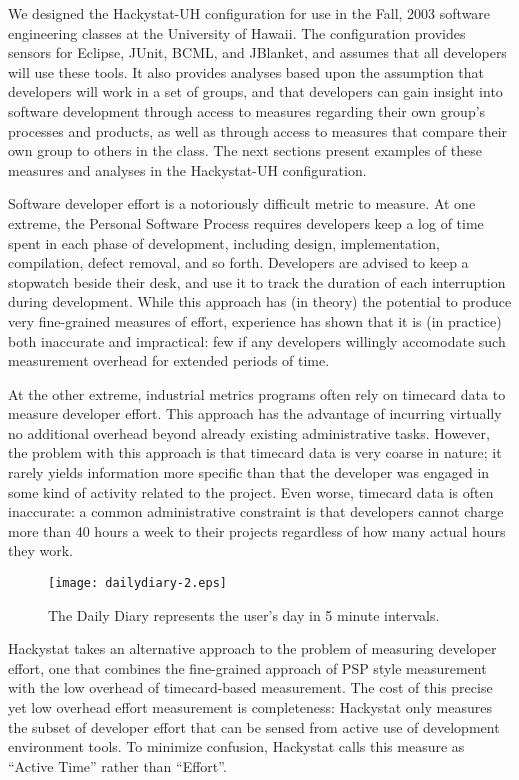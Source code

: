 \documentclass[10pt,twocolumn]{article}
\begin{document}
We designed the Hackystat-UH configuration for use in the Fall, 2003
software engineering classes at the University of Hawaii.  The
configuration provides sensors for Eclipse, JUnit, BCML, and JBlanket, and
assumes that all developers will use these tools.  It also provides
analyses based upon the assumption that developers will work in a set of
groups, and that developers can gain insight into software development
through access to measures regarding their own group's processes and
products, as well as through access to measures that compare their own
group to others in the class.  The next sections present examples of these
measures and analyses in the Hackystat-UH configuration.


Software developer effort is a notoriously difficult metric to measure.  At
one extreme, the Personal Software Process requires developers keep a log
of time spent in each phase of development, including design,
implementation, compilation, defect removal, and so forth.  Developers are
advised to keep a stopwatch beside their desk, and use it to track the
duration of each interruption during development.  While this approach has
(in theory) the potential to produce very fine-grained measures of effort,
experience has shown that it is (in practice) both inaccurate and
impractical: few if any developers willingly accomodate such measurement
overhead for extended periods of time.

At the other extreme, industrial metrics programs often rely on timecard
data to measure developer effort.  This approach has the advantage of
incurring virtually no additional overhead beyond already
existing administrative tasks.  However, the problem with this approach is
that timecard data is very coarse in nature; it rarely yields information
more specific than that the developer was engaged in some kind of activity
related to the project.  Even worse, timecard data is often inaccurate: a
common administrative constraint is that developers cannot charge more than
40 hours a week to their projects regardless of how many actual hours they
work.

\begin{figure*}[ht]
  \centering
  \texttt{[image: dailydiary-2.eps]}
  \caption{The Daily Diary represents the user's day in 5 minute intervals.}
  \label{fig:dailydiary}
\end{figure*}


Hackystat takes an alternative approach to the problem of measuring
developer effort, one that combines the fine-grained approach of PSP style
measurement with the low overhead of timecard-based measurement.  The cost
of this precise yet low overhead effort measurement is completeness:
Hackystat only measures the subset of developer effort that can be sensed
from active use of development environment tools.  To minimize confusion,
Hackystat calls this measure as ``Active Time'' rather than ``Effort''.
\end{document}
